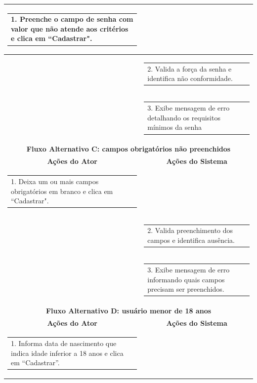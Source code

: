 \begin{longtable}[c]{|p{}|p{}|}
\multicolumn{1}{|p{0.48\textwidth}|}{\begin{tabular}[c]{@{}p{}@{}}1. Preenche o campo de senha com valor que não atende aos critérios e clica em ``Cadastrar".\end{tabular}} &
   \\ \hline
\multicolumn{1}{|p{0.48\textwidth}|}{} &
  \begin{tabular}[c]{@{}p{}@{}}2. Valida a força da senha e identifica não conformidade.\end{tabular} \\ \hline
\multicolumn{1}{|p{0.48\textwidth}|}{} &
  \begin{tabular}[c]{@{}p{}@{}}3. Exibe mensagem de erro detalhando os requisitos mínimos da senha\end{tabular} \\ \hline
\multicolumn{2}{|c|}{\textbf{Fluxo Alternativo C: campos obrigatórios não preenchidos}} \\ \hline
\multicolumn{1}{|c|}{\textbf{Ações do Ator}} &
  \multicolumn{1}{c|}{\textbf{Ações do Sistema}} \\ \hline
\multicolumn{1}{|p{0.48\textwidth}|}{\begin{tabular}[c]{@{}p{}@{}}1. Deixa um ou mais campos obrigatórios em branco e clica em ``Cadastrar".\end{tabular}} &
   \\ \hline
\multicolumn{1}{|p{0.48\textwidth}|}{} &
  \begin{tabular}[c]{@{}p{}@{}}2. Valida preenchimento dos campos e identifica ausência.\end{tabular} \\ \hline
\multicolumn{1}{|p{0.48\textwidth}|}{} &
  \begin{tabular}[c]{@{}p{}@{}}3. Exibe mensagem de erro informando quais campos precisam ser preenchidos.\end{tabular} \\ \hline
\multicolumn{2}{|c|}{\textbf{Fluxo Alternativo D: usuário menor de 18 anos}} \\ \hline
\multicolumn{1}{|c|}{\textbf{Ações do Ator}} &
  \multicolumn{1}{c|}{\textbf{Ações do Sistema}} \\ \hline
\multicolumn{1}{|p{0.48\textwidth}|}{\begin{tabular}[c]{@{}p{}@{}}1. Informa data de nascimento que indica idade inferior a 18 anos e clica em “Cadastrar”.\end{tabular}} &

\end{longtable}
